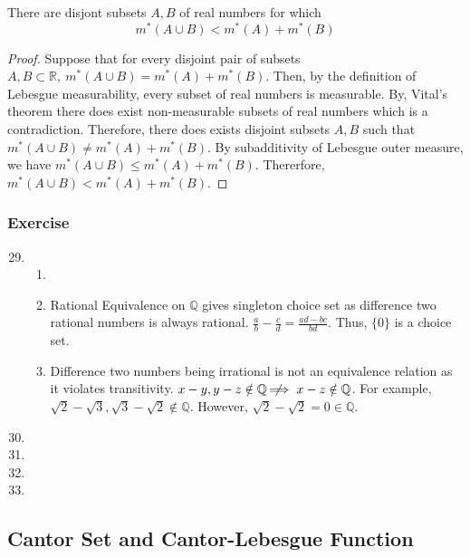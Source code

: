 \begin{theorem}
	There are disjont subsets $A,B$ of real numbers for which
	\begin{equation}
		m^\ast(A \cup B) < m^\ast(A) + m^\ast(B)
	\end{equation}
\end{theorem}
\begin{proof}
	Suppose that for every disjoint pair of subsets $A,B \subset \mathbb{R},\ m^\ast(A \cup B) = m^\ast(A) + m^\ast(B)$.
	Then, by the definition of Lebesgue measurability, every subset of real numbers is measurable.
	By, Vital's theorem there does exist non-measurable subsets of real numbers which is a contradiction.
	Therefore, there does exists disjoint subsets $A,B$ such that $m^\ast(A \cup B) \ne m^\ast(A) + m^\ast(B)$.
	By subadditivity of Lebesgue outer measure, we have $m^\ast(A \cup B) \le m^\ast(A) + m^\ast(B)$.
	Thererfore, $m^\ast(A \cup B) < m^\ast(A)+ m^\ast(B)$.
\end{proof}

\subsubsection{Exercise}
\begin{enumerate}
	\setcounter{enumi}{28}
	\item
	\begin{enumerate}
		\item
		\item Rational Equivalence on $\mathbb{Q}$ gives singleton choice set as difference two rational numbers is always rational. $\frac{a}{b} - \frac{c}{d} = \frac{ad-bc}{bd}$. Thus, $\{ 0 \}$ is a choice set.
		\item Difference two numbers being irrational is not an equivalence relation as it violates transitivity.
		$x - y, y-z \notin \mathbb{Q} \;\not\nobreak\!\!\!\!\implies x-z \notin \mathbb{Q}$.
		For example, $\sqrt{2} - \sqrt{3}, \sqrt{3} - \sqrt{2}  \notin \mathbb{Q}$.
		However, $\sqrt{2} - \sqrt{2} = 0 \in \mathbb{Q}$.
		\end{enumerate}
	\item
	\item
	\item
	\item
\end{enumerate}

\subsection{Cantor Set and Cantor-Lebesgue Function}

